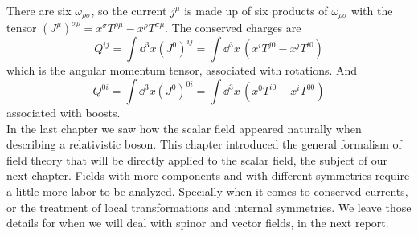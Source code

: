  There are six $\omega_{\rho\sigma}$, so the current $j^\mu$ is made up of six products of $\omega_{\rho\sigma}$   with the tensor $\left(J^{\mu}\right)^{\sigma\rho}= x^{\sigma}T^{\rho\mu}-x^\rho T^{\sigma\mu}$.
The conserved charges are 
 \begin{equation}
     Q^{ij}=\int \dd^3x \left(J^{0}\right)^{ij}=\int\dd^3x\,( x^{i}T^{j0}-x^jT^{i0})
 \end{equation}
which is the angular momentum tensor, associated with rotations. And
 \begin{equation}
     Q^{0i}=\int \dd^3x \left(J^{0}\right)^{0i}=\int\dd^3x\,( x^{0}T^{i0}-x^iT^{00})
 \end{equation}
 associated with boosts.\\
 
 In the last chapter we saw how the scalar field appeared naturally when describing a relativistic boson.  This chapter introduced the general formalism of field theory that will be directly applied to the scalar field, the subject of our next chapter. Fields with more components and with different symmetries require a little more labor to be analyzed. Specially when it comes to conserved currents, or the treatment of local transformations and internal symmetries. We leave those details for when we will deal with spinor and vector fields, in the next report.